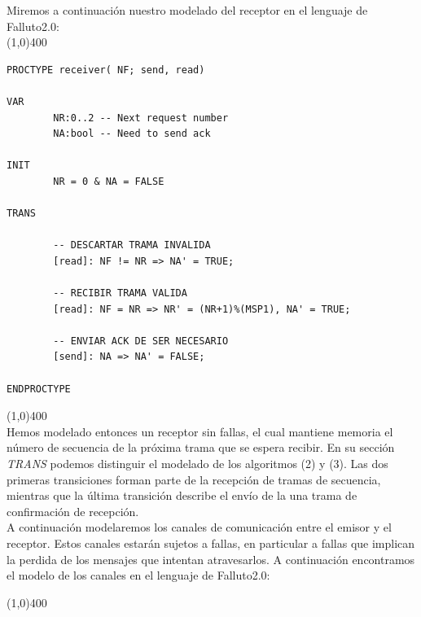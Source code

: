 \documentclass[titlepage, 12pt]{book}
\begin{document}
Miremos a continuaci\'on nuestro modelado del receptor en el lenguaje de Falluto2.0:\\

\noindent \line(1,0){400}\\

\begin{verbatim}
PROCTYPE receiver( NF; send, read)

VAR
        NR:0..2 -- Next request number
        NA:bool -- Need to send ack

INIT
        NR = 0 & NA = FALSE

TRANS

        -- DESCARTAR TRAMA INVALIDA
        [read]: NF != NR => NA' = TRUE;

        -- RECIBIR TRAMA VALIDA
        [read]: NF = NR => NR' = (NR+1)%(MSP1), NA' = TRUE;

        -- ENVIAR ACK DE SER NECESARIO
        [send]: NA => NA' = FALSE;

ENDPROCTYPE
\end{verbatim}

\noindent \line(1,0){400}\\

Hemos modelado entonces un receptor sin fallas, el cual mantiene memoria el n\'umero de secuencia de la pr\'oxima trama que se espera recibir. En su secci\'on \textit{TRANS} podemos distinguir el modelado de los algoritmos (2) y (3). Las dos primeras transiciones forman parte de la recepci\'on de tramas de secuencia, mientras que la \'ultima transici\'on describe el env\'io de la una trama de confirmaci\'on de recepci\'on.\\

A continuaci\'on modelaremos los canales de comunicaci\'on entre el emisor y el receptor. Estos canales estar\'an sujetos a fallas, en particular a fallas que implican la perdida de los mensajes que intentan atravesarlos. A continuaci\'on encontramos el modelo de los canales en el lenguaje de Falluto2.0:

\noindent \line(1,0){400}
\end{document}
